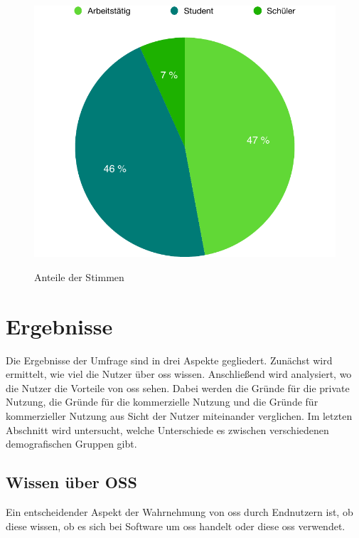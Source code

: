 \documentclass[a4paper]{article}
\begin{document}
\begin{figure}[h]
            \centering
            \begin{minipage}{.5\textwidth}
                \centering
                \includegraphics[width=\textwidth]{assets/results/validity/rowsPerActivity}
                \label{fig:rowsPer:activity}
            \end{minipage}
            \caption{Anteile der Stimmen}
        \end{figure}

    \clearpage
    \section{Ergebnisse}
    
        Die Ergebnisse der Umfrage sind in drei Aspekte gegliedert. Zunächst wird ermittelt, wie viel die Nutzer über \gls{oss} wissen. Anschließend wird analysiert, wo die Nutzer die Vorteile von \gls{oss} sehen. Dabei werden die Gründe für die private Nutzung, die Gründe für die kommerzielle Nutzung und die Gründe für kommerzieller Nutzung aus Sicht der Nutzer miteinander verglichen. Im letzten Abschnitt wird untersucht, welche Unterschiede es zwischen verschiedenen demografischen Gruppen gibt.
        
        \subsection{Wissen über OSS}\label{section:knowledge_oss}
            Ein entscheidender Aspekt der Wahrnehmung von \gls{oss} durch Endnutzern ist, ob diese wissen, ob es sich bei Software um \gls{oss} handelt oder diese \gls{oss} verwendet.
            
\end{document}
